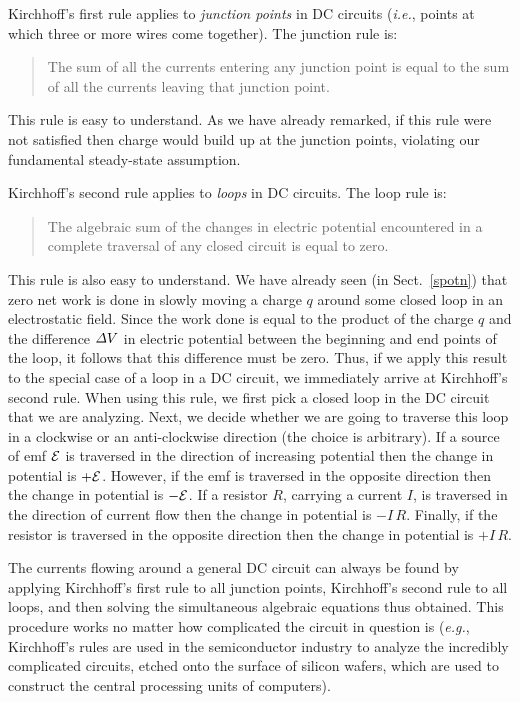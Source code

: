 Kirchhoff's first rule applies to {\em junction points}\/ in DC circuits ({\em i.e.},
points at which three or more wires come together). The junction rule is:
\begin{quote}
{\sf The sum of all the currents entering any junction point is equal to
the sum of all the currents leaving that junction point.}
\end{quote}
This rule is easy to understand. As we have already remarked, if this rule
were not satisfied then charge would build up at the junction points, violating our
fundamental steady-state assumption. 

Kirchhoff's second rule applies to {\em loops}\/ in DC circuits. The loop rule is:
\begin{quote}
{\sf The algebraic sum of the changes in electric potential encountered in a
complete traversal of any closed circuit is equal to zero.}
\end{quote}
This rule is also easy to understand. We have already seen (in Sect.~\ref{spotn})
that zero net work is done
in slowly moving a charge $q$ around some closed loop in an electrostatic field.
Since the work done is equal to the product of the charge $q$ and the difference
${\mit\Delta}V$ in electric potential between the beginning and end points of
the loop, it follows that this difference must be zero. Thus, if we apply this
result to the special case of a
 loop in a DC circuit, we immediately arrive at Kirchhoff's second rule.
When using this rule, we first pick a closed loop in the DC circuit that
we are analyzing. Next, we decide whether we are going to traverse this
loop in a clockwise or an anti-clockwise direction (the choice is arbitrary).
If a source of emf ${\cal E}$ is traversed in the direction of increasing potential
then 
the change in potential is $+{\cal E}$. 
However, if the emf is traversed in the opposite direction then the change in potential is $-{\cal E}$. If a resistor $R$, carrying a
current $I$, is traversed in the direction of current flow then the change in
potential is $-I\,R$. Finally, if the resistor is traversed in the
opposite direction then the change in potential is $+I\,R$. 

The currents flowing around a general DC circuit can always be found by applying 
Kirchhoff's first rule to all junction points, 
Kirchhoff's second rule to all loops, and then solving the 
simultaneous algebraic equations thus obtained. This procedure works
no matter how complicated the circuit in question is ({\em e.g.}, Kirchhoff's
rules are used in the semiconductor industry to analyze the incredibly
complicated circuits, etched onto the surface of silicon wafers, which are used to
construct the central processing units of computers).  

